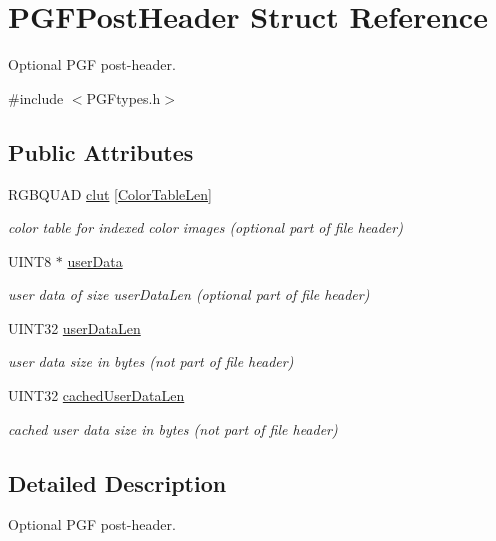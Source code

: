 \hypertarget{structPGFPostHeader}{}\section{P\+G\+F\+Post\+Header Struct Reference}
\label{structPGFPostHeader}


Optional P\+GF post-\/header.  




{\ttfamily \#include $<$P\+G\+Ftypes.\+h$>$}

\subsection*{Public Attributes}
\begin{DoxyCompactItemize}
\item 
R\+G\+B\+Q\+U\+AD \mbox{\hyperlink{structPGFPostHeader_a3a7faf3091c0faa2e508ecdeb54ea706}{clut}} \mbox{[}\mbox{\hyperlink{PGFtypes_8h_a9d98169485fbcb79dd2277c567f3f27d}{Color\+Table\+Len}}\mbox{]}
\begin{DoxyCompactList}\small\item\em color table for indexed color images (optional part of file header) \end{DoxyCompactList}\item 
U\+I\+N\+T8 $\ast$ \mbox{\hyperlink{structPGFPostHeader_aeeb6e57e8343eb3d42406f0baf3ae6e1}{user\+Data}}
\begin{DoxyCompactList}\small\item\em user data of size user\+Data\+Len (optional part of file header) \end{DoxyCompactList}\item 
U\+I\+N\+T32 \mbox{\hyperlink{structPGFPostHeader_a0fb630d6cd14ed865dd5fe20227279f2}{user\+Data\+Len}}
\begin{DoxyCompactList}\small\item\em user data size in bytes (not part of file header) \end{DoxyCompactList}\item 
U\+I\+N\+T32 \mbox{\hyperlink{structPGFPostHeader_a104e3ef6de85dfdbbd867a250fcd82d4}{cached\+User\+Data\+Len}}
\begin{DoxyCompactList}\small\item\em cached user data size in bytes (not part of file header) \end{DoxyCompactList}\end{DoxyCompactItemize}


\subsection{Detailed Description}
Optional P\+GF post-\/header. 

